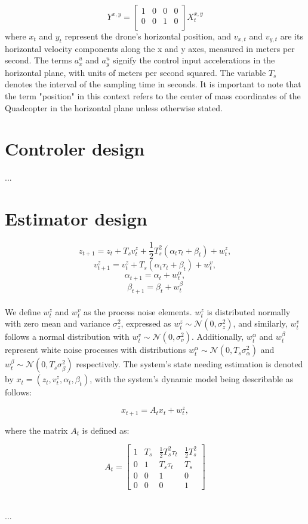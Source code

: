 \documentclass{article}
\begin{document}
\begin{equation}
    Y^{x,y} = 
\begin{bmatrix}
    1 & 0 & 0 & 0 \\
    0 & 0 & 1 & 0 \\
\end{bmatrix}
X_t^{x,y}
\end{equation}
where \( x_t \) and \( y_t \) represent the drone's horizontal position,
 and \( v_{x,t} \) and \( v_{y,t} \) are its horizontal velocity 
 components along the x and y axes, measured in meters per second. 
 The terms \( a_{x}^u \) and \( a_{y}^u \) signify the control input 
 accelerations in the horizontal plane, with units of meters per second 
 squared. The variable \( T_s \) denotes the interval of the sampling 
 time in seconds. It is important to note that the term "position" in 
 this context refers to the center of mass coordinates of the Quadcopter in the 
 horizontal plane unless otherwise stated.
\section{Controler design}
...
\section{Estimator design}

\begin{equation}
    z_{t+1} = z_t + T_s v_t^z + \frac{1}{2} T_s^2 (\alpha_t \tau_t + \beta_t) + w_t^z,
\end{equation}
\begin{equation}
    v_{t+1}^z = v_t^z + T_s (\alpha_t \tau_t + \beta_t) + w_t^v,
\end{equation}
\begin{equation}
    \alpha_{t+1} = \alpha_t + w_t^\alpha,
\end{equation}
\begin{equation}
    \beta_{t+1} = \beta_t + w_t^\beta
\end{equation}
\\

\noindent
We define $w_t^z$ and $w_t^v$ as the process noise elements.
$w_t^z$ is distributed normally with zero mean and variance
$\sigma_z^2$, expressed as $w_t^z \sim \mathcal{N}(0, \sigma_z^2)$, 
and similarly, $w_t^v$ follows a normal distribution with $w_t^v \sim \mathcal{N}(0, \sigma_v^2)$.
Additionally, $w_t^\alpha$ and $w_t^\beta$ represent white noise processes with distributions
$w_t^\alpha \sim \mathcal{N}(0, T_s \sigma_\alpha^2)$ and $w_t^\beta \sim \mathcal{N}(0, T_s \sigma_\beta^2)$ 
respectively. The system's state needing estimation is denoted by $x_t = (z_t, v_t^z, \alpha_t, \beta_t)$, 
with the system's dynamic model being describable as follows:

\[
x_{t+1} = A_t x_t + w_t^z,
\]

where the matrix $A_t$ is defined as:

\[
A_t = \begin{bmatrix}
1 & T_s & \frac{1}{2} T_s^2 \tau_t & \frac{1}{2} T_s^2 \\
0 & 1 & T_s \tau_t & T_s \\
0 & 0 & 1 & 0 \\
0 & 0 & 0 & 1
\end{bmatrix}
\]

\\

\noindent
...
\end{document}
